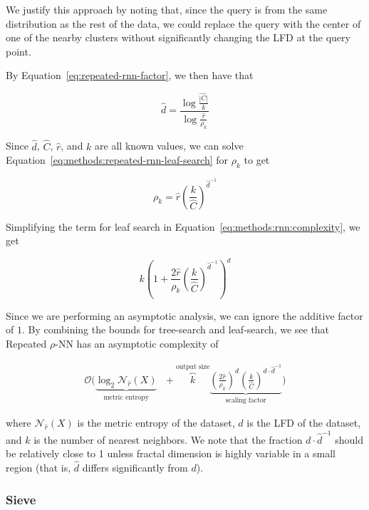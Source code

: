 We justify this approach by noting that, since the query is from the same distribution as the rest of the data, we could replace the query with the center of one of the nearby clusters without significantly changing the LFD at the query point.

By Equation~\ref{eq:repeated-rnn-factor}, we then have that

\begin{equation*}
    \hat{d} = \frac{\log{}\frac{\hat{|C|}}{k}}{\log{}\frac{\hat{r}}{\rho_k}}
\end{equation*}

Since $\hat{d}$, $\hat{C}$, $\hat{r}$, and $k$ are all known values, we can solve Equation~\ref{eq:methods:repeated-rnn-leaf-search} for $\rho_k$ to get

\begin{equation*}
    \rho_k = \hat{r} \left( \frac{k}{\hat{C}} \right)^{\hat{d}^{-1}}
\end{equation*}

Simplifying the term for leaf search in Equation~\ref{eq:methods:rnn:complexity}, we get

\begin{equation*}
    k \left( 1+ \frac{2\hat{r}}{\rho_k} \left( \frac{k}{\hat{C}} \right) ^ {\hat{d}^{-1}} \right)^d
\end{equation*}

Since we are performing an asymptotic analysis, we can ignore the additive factor of $1$.
By combining the bounds for tree-search and leaf-search, we see that Repeated $\rho$-NN has an asymptotic complexity of

\begin{gather}
    \mathcal{O}
    \Bigg(
        \underbrace{\log_2{\mathcal{N}_{\hat{r}}(X)}}_{\textrm{metric entropy}} \ \ \ + 
        \overbrace{k}^{\textrm{output size}}
        \underbrace{
            \left( \frac{2\hat{r}}{\rho_k} \right) ^ d \left( \frac{k}{\hat{C}} \right) ^ {d \cdot \hat{d}^{-1}}
        }_{\textrm{scaling factor}}
    \Bigg)
    \label{eq:methods:knn-by-rnn-complexity}
\end{gather}

where $\mathcal{N}_{\hat{r}}(X)$ is the metric entropy of the dataset, $d$ is the LFD of the dataset, and $k$ is the number of nearest neighbors.
We note that the fraction $d \cdot \hat{d}^{-1}$ should be relatively close to 1 unless fractal dimension is highly variable in a small region (that is, $\hat{d}$ differs significantly from $d$).


\subsubsection{Sieve}
\label{subsubsec:methods:knn:sieve}

